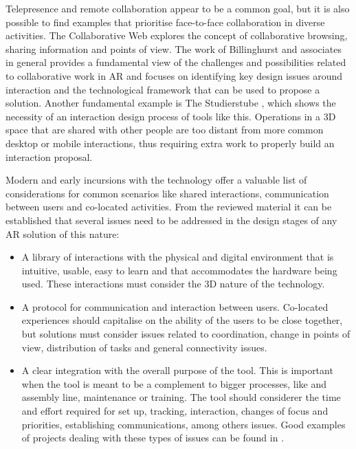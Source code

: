 Telepresence and remote collaboration appear to be a common goal, but it is also possible to find examples that prioritise face-to-face collaboration in diverse activities. The Collaborative
Web \parencite{billinghurst_1999} explores the concept of collaborative browsing, sharing information and points of view. The work of Billinghurst and associates in general provides a
fundamental view of the challenges and possibilities related to collaborative work in \ac{AR} and focuses on identifying key design issues around interaction and the technological
framework that can be used to propose a solution. Another fundamental example is The Studierstube \parencite{schmalstieg_2002}, which shows the necessity of an interaction design process of
tools like this. Operations in a 3D space that are shared with other people are too distant from more common desktop or mobile interactions, thus requiring extra work to properly build an
interaction proposal.

Modern and early incursions with the technology offer a valuable list of considerations for common scenarios like shared interactions, communication between users and co-located activities.
From the reviewed material it can be established that several issues need to be addressed in the design stages of any \ac{AR} solution of this nature:

\begin{itemize}
    \item A library of interactions with the physical and digital environment that is intuitive, usable, easy to learn and that accommodates the hardware being used. These interactions must
    consider the 3D nature of the technology.
    \item A protocol for communication and interaction between users. Co-located experiences should capitalise on the ability of the users to be close together, but solutions must consider
    issues related to coordination, change in points of view, distribution of tasks and general connectivity issues.
    \item A clear integration with the overall purpose of the tool. This is important when the tool is meant to be a complement to bigger processes, like and assembly line, maintenance or
    training. The tool should considerer the time and effort required for set up, tracking, interaction, changes of focus and priorities, establishing communications, among others issues.
    Good examples of projects dealing with these types of issues can be found in \textcite{tang_2003,huang_2013}.
\end{itemize}

